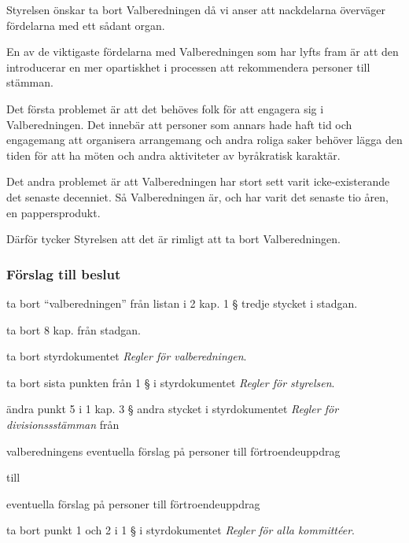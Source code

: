 \documentclass[protokoll]{dvd}
\begin{document}
Styrelsen önskar ta bort Valberedningen då vi anser att nackdelarna överväger fördelarna med ett sådant organ.

En av de viktigaste fördelarna med Valberedningen som har lyfts fram är att den introducerar en mer opartiskhet i processen att rekommendera personer till stämman.

Det första problemet är att det behöves folk för att engagera sig i Valberedningen.
Det innebär att personer som annars hade haft tid och engagemang att organisera arrangemang och andra roliga saker behöver lägga den tiden för att ha möten och andra aktiviteter av byråkratisk karaktär.

Det andra problemet är att Valberedningen har stort sett varit icke-existerande det senaste decenniet.
Så Valberedningen är, och har varit det senaste tio åren, en pappersprodukt.

Därför tycker Styrelsen att det är rimligt att ta bort Valberedningen.

\subsubsection*{Förslag till beslut}

\begin{attsatser}
	\item ta bort ``valberedningen'' från listan i 2 kap. 1 § tredje stycket i stadgan.

	\item ta bort 8 kap. från stadgan.

	\item ta bort styrdokumentet \emph{Regler för valberedningen}.

	\item ta bort sista punkten från 1 § i styrdokumentet \emph{Regler för styrelsen}.

	\item ändra punkt 5 i 1 kap. 3 § andra stycket i styrdokumentet \emph{Regler för divisionssstämman} från

	\begin{displayquote}
		valberedningens eventuella förslag på personer till förtroendeuppdrag
	\end{displayquote}

	till

	\begin{displayquote}
		eventuella förslag på personer till förtroendeuppdrag
	\end{displayquote}

	\item ta bort punkt 1 och 2 i 1 § i styrdokumentet \emph{Regler för alla kommittéer}.
\end{attsatser}
\end{document}
